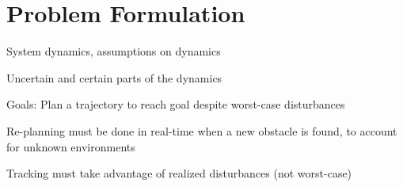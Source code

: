 \section{Problem Formulation}
System dynamics, assumptions on dynamics

Uncertain and certain parts of the dynamics

Goals:
Plan a trajectory to reach goal despite worst-case disturbances

Re-planning must be done in real-time when a new obstacle is found, to account for unknown environments

Tracking must take advantage of realized disturbances (not worst-case)